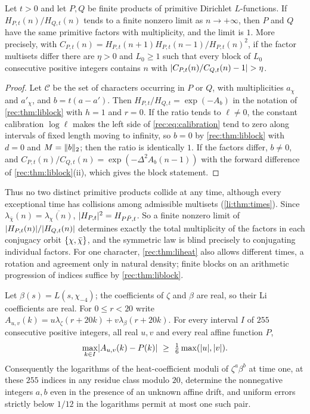 \begin{corollary}\label{li:thm:products}
Let $t>0$ and let $P,Q$ be finite products of primitive Dirichlet $L$-functions. If $H_{P,t}(n)/H_{Q,t}(n)$
tends to a finite nonzero limit as $n\to+\infty$, then $P$ and $Q$ have the same primitive factors with
multiplicity, and the limit is $1$. More precisely, with $C_{P,t}(n)=H_{P,t}(n+1)H_{P,t}(n-1)/H_{P,t}(n)^2$, if the factor
multisets differ there are $\eta>0$ and $L_0\ge1$ such that every block of $L_0$ consecutive positive integers
contains $n$ with $\lvert C_{P,t}(n)/C_{Q,t}(n)-1\rvert>\eta$.
\end{corollary}

\begin{proof}
Let $\mathcal C$ be the set of characters occurring in $P$ or $Q$, with multiplicities $a_\chi$ and $a'_\chi$, and $b=t(a-a')$.
Then $H_{P,t}/H_{Q,t}=\exp(-A_b)$ in the notation of \cref{rec:thm:liblock} with $h=1$ and $r=0$. If the ratio tends to
$\ell\ne0$, the constant calibration $\log\ell$ makes the left side of \eqref{rec:eq:calibration} tend to zero along
intervals of fixed length moving to infinity, so $b=0$ by \cref{rec:thm:liblock} with $d=0$ and $M=\lVert b\rVert_2$; then the
ratio is identically $1$. If the factors differ, $b\ne0$, and $C_{P,t}(n)/C_{Q,t}(n)=\exp(-\Delta^2A_b(n-1))$ with the
forward difference of \cref{rec:thm:liblock}(ii), which gives the block statement.
\end{proof}

Thus no two distinct primitive products collide at any time, although every exceptional time has
collisions among admissible multisets (\cref{li:thm:times}). Since $\lambda_{\bar\chi}(n)=\overline{\lambda_\chi(n)}$,
$\lvert H_{P,t}\rvert^2=H_{P\bar P,t}$. So a finite nonzero limit of $\lvert H_{P,t}(n)\rvert/\lvert H_{Q,t}(n)\rvert$ determines exactly the total
multiplicity of the factors in each conjugacy orbit $\{\chi,\bar\chi\}$, and the symmetric law is blind precisely to
conjugating individual factors. For one character, \cref{rec:thm:liheat} also allows different
times, a rotation and agreement only in natural density; finite blocks on an arithmetic progression of indices
suffice by \cref{rec:thm:liblock}.

\begin{theorem}\label{rec:thm:li255}
Let $\beta(s)=L(s,\chi_{-4})$; the coefficients of $\zeta$ and $\beta$ are real, so their Li coefficients are real. For
$0\le r<20$ write $A_{u,v}(k)=u\lambda_\zeta(r+20k)+v\lambda_\beta(r+20k)$. For every interval $I$ of $255$ consecutive positive
integers, all real $u,v$ and every real affine function $P$,
\[
 \max_{k\in I}\abs{A_{u,v}(k)-P(k)}\ \ge\ \tfrac16\max(\abs u,\abs v).
\]
Consequently the logarithms of the heat-coefficient moduli of $\zeta^a\beta^b$ at time one, at these $255$ indices in any
residue class modulo $20$, determine the nonnegative integers $a,b$ even in the presence of an unknown affine
drift, and uniform errors strictly below $1/12$ in the logarithms permit at most one such pair.
\end{theorem}


